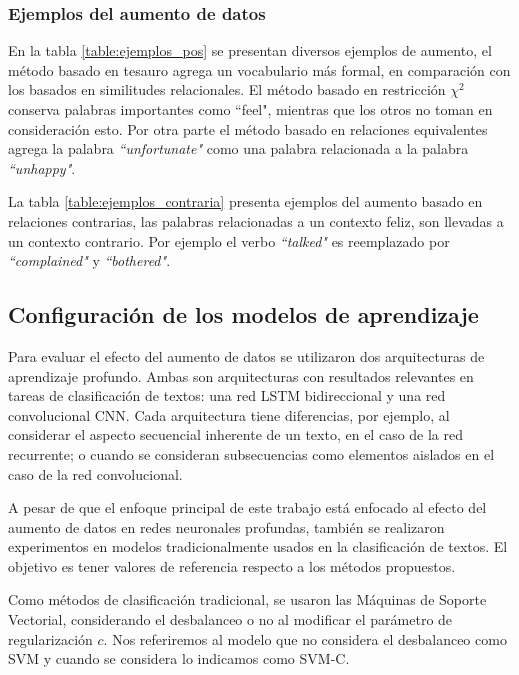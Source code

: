 

\subsubsection{Ejemplos del aumento de datos}
En la tabla \ref{table:ejemplos_pos} se presentan diversos ejemplos de aumento, el método basado en tesauro agrega un vocabulario más formal, en comparación con los basados en similitudes relacionales. El método basado en restricción $\chi^2$ conserva palabras importantes como ``feel", mientras que los otros no toman en consideración esto. Por otra parte el método basado en relaciones equivalentes agrega la palabra \textit{``unfortunate"} como una palabra relacionada a la palabra \textit{``unhappy"}.

La tabla \ref{table:ejemplos_contraria} presenta ejemplos del aumento basado en relaciones contrarias, las palabras relacionadas a un contexto feliz, son llevadas a un contexto contrario. Por ejemplo el verbo \textit{``talked"} es reemplazado por \textit{``complained"} y \textit{``bothered"}.




 
\subsection{Configuración de los modelos de aprendizaje}

Para evaluar el efecto del aumento de datos se utilizaron dos arquitecturas de aprendizaje profundo. Ambas son arquitecturas con resultados relevantes en tareas de clasificación de textos: una red LSTM bidireccional y una red convolucional CNN. Cada arquitectura tiene diferencias, por ejemplo, al considerar el aspecto secuencial inherente de un texto, en el caso de la red recurrente; o cuando se consideran subsecuencias como elementos aislados en el caso de la red convolucional.

A pesar de que el enfoque principal de este trabajo está enfocado al efecto del aumento de datos en redes neuronales profundas, también se realizaron experimentos en modelos tradicionalmente usados en la clasificación de textos. El objetivo es tener valores de referencia respecto a los métodos propuestos. 

Como métodos de clasificación tradicional, se usaron las Máquinas de Soporte Vectorial, considerando el desbalanceo o no al modificar el parámetro de regularización $c$. Nos referiremos al modelo que no considera el desbalanceo como SVM y cuando se considera lo indicamos como SVM-C. 


